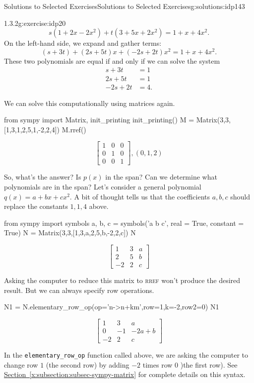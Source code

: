 \documentclass[oneside,10pt,]{book}
\newcommand{\xreffont}{\relax}
\newcommand{\mono}[1]{\texttt{#1}}
\newcommand{\initialism}[1]{\textsc{\MakeLowercase{#1}}}
\numberwithin{equation}{section}
\newcommand{\bbm}{\begin{bmatrix}}
\newcommand{\ebm}{\end{bmatrix}}
\newcommand{\amp}{&}
\begin{document}
\begin{solutions-chapter}{Solutions to Selected Exercises}{}{Solutions to Selected Exercises}{}{}{g:solutions:idp143}
\begin{inlinesolution}{1.3.2}{}{g:exercise:idp20}
\begin{equation*}
s(1+2x-2x^2)+t(3+5x+2x^2)=1+x+4x^2\text{.}
\end{equation*}
On the left-hand side, we expand and gather terms:%
\begin{equation*}
(s+3t)+(2s+5t)x+(-2s+2t)x^2 = 1+x+4x^2\text{.}
\end{equation*}
These two polynomials are equal if and only if we can solve the system%
\begin{align*}
s+3t \amp = 1 \\
2s+5t \amp =1\\
-2s+2t \amp =4\text{.}
\end{align*}
%
\par
We can solve this computationally using matrices again.%
\begin{sageinput}
from sympy import Matrix, init_printing
init_printing()
M = Matrix(3,3,[1,3,1,2,5,1,-2,2,4])
M.rref()
\end{sageinput}
\begin{sageoutput}
\[\bbm 1\amp 0\amp 0\\0\amp 1\amp 0\\0\amp 0\amp 1\ebm, (0,1,2)\]
\end{sageoutput}
So, what's the answer? Is \(p(x)\) in the span? Can we determine what polynomials are in the span? Let's consider a general polynomial \(q(x)=a+bx+cx^2\). A bit of thought tells us that the coefficients \(a,b,c\) should replace the constants \(1,1,4\) above.%
\begin{sageinput}
from sympy import symbols
a, b, c = symbols('a b c', real = True, constant = True)
N = Matrix(3,3,[1,3,a,2,5,b,-2,2,c])
N
\end{sageinput}
\begin{sageoutput}
\[\bbm 1\amp 3\amp a\\2\amp 5\amp b\\-2\amp 2\amp c\ebm\]
\end{sageoutput}
Asking the computer to reduce this matrix to \initialism{RREF} won't produce the desired result. But we can always specify row operations.%
\begin{sageinput}
N1 = N.elementary_row_op(op='n->n+km',row=1,k=-2,row2=0)
N1
\end{sageinput}
\begin{sageoutput}
\[\bbm 1\amp 3\amp a\\0\amp -1\amp -2a+b\\-2\amp 2\amp c\ebm\]
\end{sageoutput}
In the \mono{elementary\_row\_op} function called above, we are asking the computer to change row \(1\) (the second row) by adding \(-2\) times row \(0\) )the first row). See \hyperref[x:subsection:subsec-sympy-matrix]{Section~{\xreffont\ref{x:subsection:subsec-sympy-matrix}}} for complete details on this syntax.%

\end{inlinesolution}
\end{solutions-chapter}
\end{document}
